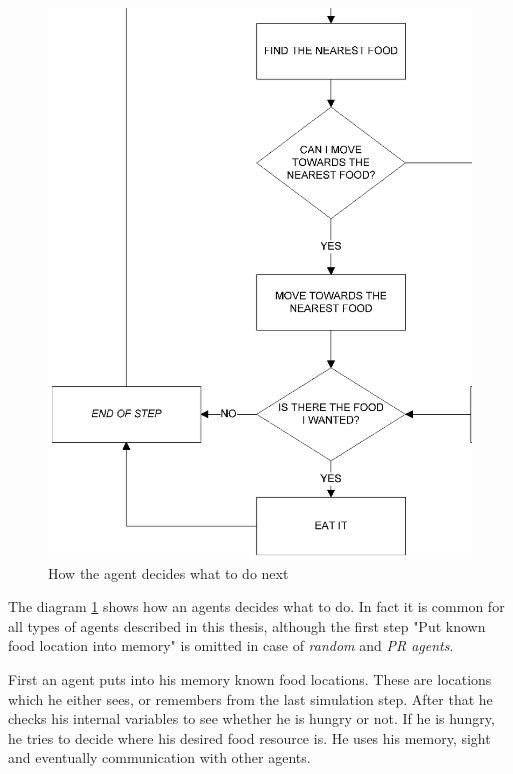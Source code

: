 \begin{figure}
  \centering                                
  \includegraphics[scale=0.7]{diagrams/solution/decision-flowchart.eps}    
  \caption{How the agent decides what to do next}
  \label{solution:decision}
\end{figure}

The diagram \ref{solution:decision} shows how an agents decides what to do. In fact it is common for all types of agents described in this thesis, although the first step "Put known food location into memory" is omitted in case of \emph{random} and \emph{PR agents}. 

First an agent puts into his memory known food locations. These are locations which he either sees, or remembers from the last simulation step. After that he checks his internal variables to see whether he is hungry or not. If he is hungry, he tries to decide where his desired food resource is. He uses his memory, sight and eventually communication with other agents. 

